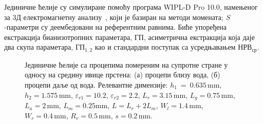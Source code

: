\documentclass[main.tex]{subfiles}
\begin{document}
Јединичне ћелије су симулиране помоћу програма WIPL-D Pro 10.0, намењеног за 3Д електромагнетну анализу~\cite{wipl}, који је базиран на методи момената; $S$-параметри су деембедовани на референтним равнима. Биће упоређена екстракција бианизотропних параметара, $ГП$, асиметрична екстракција која даје два скупа параметара, $ГП_{1,2}$ као и стандардни поступак са усредњавањем $НРВ_{ср}$.
\begin{figure}[!t]
\hfill
{}
\caption{Јединичне ћелије са процепима помереним на супротне стране у односу на средину ивице прстена: (а) процепи близу вода, (б) процепи даље од вода. Релевантне димензије: $h_1~=~0.635\,\mathrm{mm}$, $h_2=1.575\,\mathrm{mm}$, $\varepsilon_{r1}=10.2$, $\varepsilon_{r2}=2.2$, $L_r=3.15\,\mathrm{mm}$, $L_g=0.75\,\mathrm{mm}$, $L_a=2\,\mathrm{mm}$, $L_m=0.25\mathrm{mm}$, $L= L_r +2L_m$, $W_l=1.4\,\mathrm{mm}$, $W_r=0.4\,\mathrm{mm}$, $R_v=0.5\,\mathrm{mm}$, $s=0.2\,\mathrm{mm}$.}
\label{fig4}
\end{figure}
\end{document}

